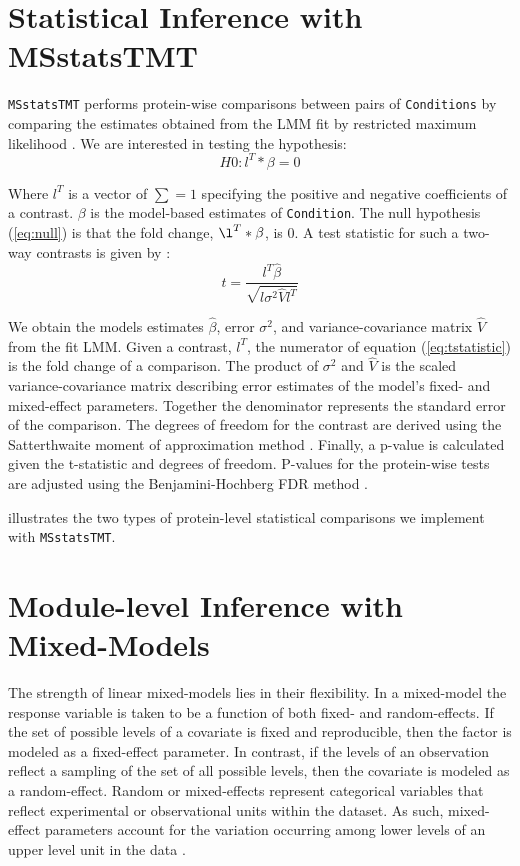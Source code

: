 \documentclass[11pt]{elife}\usepackage[]{graphicx}\usepackage[]{color}
\begin{document}
\section{Statistical Inference with MSstatsTMT}

\texttt{MSstatsTMT} performs protein-wise comparisons between pairs of
\texttt{Conditions} by comparing the estimates obtained from the LMM fit by
restricted maximum likelihood \citep{Bates2015}. We are interested in testing
the hypothesis:
\begin{equation}
	\label{eq:null} %
	H0 : l^T * \beta = 0 
\end{equation}

Where $l^T$ is a vector of $\sum=1$ specifying the positive and negative
coefficients of a contrast. $\beta$ is the model-based estimates of
\texttt{Condition}.  The null hypothesis (\ref{eq:null}) is that the fold
change, $\l^T * \beta$, is 0.  A test statistic for such a two-way contrasts is
given by \cite{Kuznetsova2017}:
\begin{equation} 
	\label{eq:tstatistic} %
	t = \frac{l^T \hat{\beta}}{\sqrt{l \sigma^2 \hat{V} l^T}}
\end{equation}

We obtain the models estimates $\hat{\beta}$, error $\sigma^2$, and
variance-covariance matrix $\hat{V}$ from the fit LMM.  Given a contrast, $l^T$,
the numerator of equation (\ref{eq:tstatistic}) is the fold change of a
comparison.  The product of $\sigma^2$ and $\hat{V}$ is the scaled
variance-covariance matrix describing error estimates of the model's fixed- and
mixed-effect parameters.  Together the denominator represents the standard error
of the comparison. The degrees of freedom for the contrast are derived using the
Satterthwaite moment of approximation method \citep{Kuznetsova2017}.  Finally, a
p-value is calculated given the t-statistic and degrees of freedom.  P-values
for the protein-wise tests are adjusted using the Benjamini-Hochberg FDR method
\citep{Huang2020}.

 illustrates the two types of protein-level statistical
comparisons we implement with \texttt{MSstatsTMT}.


\section{Module-level Inference with Mixed-Models}

The strength of linear mixed-models lies in their flexibility. In a mixed-model
the response variable is taken to be a function of both fixed- and
random-effects.  If the set of possible levels of a covariate is fixed and
reproducible, then the factor is modeled as a fixed-effect parameter.  In
contrast, if the levels of an observation reflect a sampling of the set of all
possible levels, then the covariate is modeled as a random-effect.  Random or
mixed-effects represent categorical variables that reflect experimental or
observational units within the dataset.  As such, mixed-effect parameters
account for the variation occurring among lower levels of an upper level unit in
the data \citep{Bates2015}.  
\end{document}
